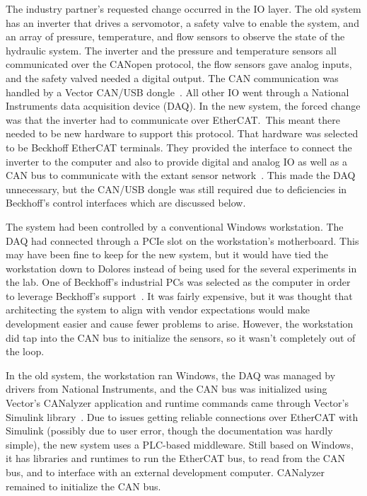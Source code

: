 \documentclass[english,12pt,a4paper,pdftex,eng,utf8]{aaltothesis}
\begin{document}
The industry partner's requested change occurred in the IO layer.  The old system has an inverter that drives a servomotor, a safety valve to enable the system, and an array of pressure, temperature, and flow sensors to observe the state of the hydraulic system.  The inverter and the pressure and temperature sensors all communicated over the CANopen protocol, the flow sensors gave analog inputs, and the safety valved needed a digital output.  The CAN communication was handled by a Vector CAN/USB dongle~\cite{VectorCanUsbDongle}.  All other IO went through a National Instruments data acquisition device (DAQ).  In the new system, the forced change was that the inverter had to communicate over EtherCAT.\  This meant there needed to be new hardware to support this protocol.  That hardware was selected to be Beckhoff EtherCAT terminals.  They provided the interface to connect the inverter to the computer and also to provide digital and analog IO as well as a CAN bus to communicate with the extant sensor network~\cite{BeckhoffEL6751}.  This made the DAQ unnecessary, but the CAN/USB dongle was still required due to deficiencies in Beckhoff's control interfaces which are discussed below.

The system had been controlled by a conventional Windows workstation.  The DAQ had connected through a PCIe slot on the workstation's motherboard.  This may have been fine to keep for the new system, but it would have tied the workstation down to Dolores instead of being used for the several experiments in the lab.  One of Beckhoff's industrial PCs was selected as the computer in order to leverage Beckhoff's support~\cite{BeckhoffC60XX}.  It was fairly expensive, but it was thought that architecting the system to align with vendor expectations would make development easier and cause fewer problems to arise.  However, the workstation did tap into the CAN bus to initialize the sensors, so it wasn't completely out of the loop.

In the old system, the workstation ran Windows, the DAQ was managed by drivers from National Instruments, and the CAN bus was initialized using Vector's CANalyzer application and runtime commands came through Vector's Simulink library~\cite{VectorCanalyzer, SimulinkVectorCAN}.  Due to issues getting reliable connections over EtherCAT with Simulink (possibly due to user error, though the documentation was hardly simple), the new system uses a PLC-based middleware.  Still based on Windows, it has libraries and runtimes to run the EtherCAT bus, to read from the CAN bus, and to interface with an external development computer.  CANalyzer remained to initialize the CAN bus.
\end{document}
